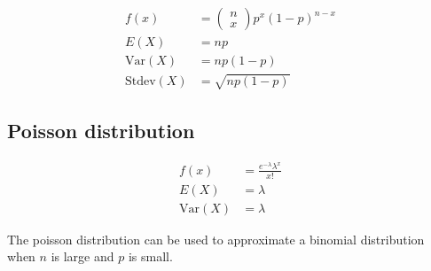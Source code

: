 \documentclass{article}
\newcommand{\var}{\text{Var}}
\begin{document}
\begin{multicols*}{2}
\begin{align*}
    f(x) &= \begin{pmatrix}
        n \\
        x
    \end{pmatrix} p^x (1-p)^{n-x} \\
    E(X) &= np \\
    \var(X) &= np(1-p) \\
    \text{Stdev}(X) &= \sqrt{np(1-p)}
\end{align*}

\subsection{Poisson distribution}

\begin{align*}
    f(x) &= \frac{e^{-\lambda} \lambda^x}{x!} \\
    E(X) &= \lambda \\
    \var(X) &= \lambda
\end{align*}

The poisson distribution can be used to approximate a binomial distribution when $n$ is large and $p$ is small.

\end{multicols*}
\end{document}
